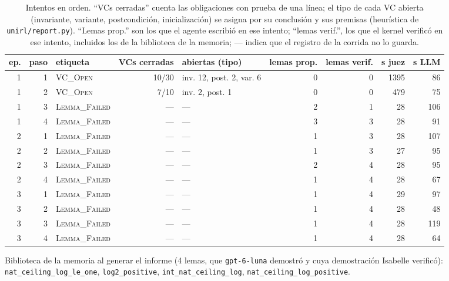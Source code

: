 \documentclass[11pt,a4paper]{article}
\begin{document}
\begin{table}[!ht]
\centering
\footnotesize
\setlength{\tabcolsep}{4pt}
\begin{tabular}{@{}rrlrlrrrr@{}}
\toprule
ep. & paso & etiqueta & VCs cerradas & abiertas (tipo) & lemas prop. & lemas verif. & s juez & s LLM \\
\midrule
1 & 1 & \textsc{VC\_Open} & 10/30 & inv. 12, post. 2, var. 6 & 0 & 0 & 1395 & 86 \\
1 & 2 & \textsc{VC\_Open} & 7/10 & inv. 2, post. 1 & 0 & 0 & 479 & 75 \\
1 & 3 & \textsc{Lemma\_Failed} & --- & --- & 2 & 1 & 28 & 106 \\
1 & 4 & \textsc{Lemma\_Failed} & --- & --- & 3 & 3 & 28 & 91 \\
2 & 1 & \textsc{Lemma\_Failed} & --- & --- & 1 & 3 & 28 & 107 \\
2 & 2 & \textsc{Lemma\_Failed} & --- & --- & 1 & 3 & 27 & 95 \\
2 & 3 & \textsc{Lemma\_Failed} & --- & --- & 2 & 4 & 28 & 95 \\
2 & 4 & \textsc{Lemma\_Failed} & --- & --- & 1 & 4 & 28 & 67 \\
3 & 1 & \textsc{Lemma\_Failed} & --- & --- & 1 & 4 & 29 & 97 \\
3 & 2 & \textsc{Lemma\_Failed} & --- & --- & 1 & 4 & 28 & 48 \\
3 & 3 & \textsc{Lemma\_Failed} & --- & --- & 1 & 4 & 28 & 119 \\
3 & 4 & \textsc{Lemma\_Failed} & --- & --- & 1 & 4 & 28 & 64 \\
\bottomrule
\end{tabular}
\caption{Intentos en orden. ``VCs cerradas'' cuenta las obligaciones con prueba de una línea; el tipo de cada VC abierta (invariante, variante, postcondición, inicialización) se asigna por su conclusión y sus premisas (heurística de \texttt{unirl/report.py}). ``Lemas prop.'' son los que el agente escribió en ese intento; ``lemas verif.'', los que el kernel verificó en ese intento, incluidos los de la biblioteca de la memoria; --- indica que el registro de la corrida no lo guarda.}
\label{tab:intentos-bisection_isabelle_lemas_mem-0}
\end{table}

Biblioteca de la memoria al generar el informe (4 lemas, que \texttt{gpt-\allowbreak{}6-\allowbreak{}luna} demostró y cuya demostración Isabelle verificó): \texttt{nat\_\allowbreak{}ceiling\_\allowbreak{}log\_\allowbreak{}le\_\allowbreak{}one}, \texttt{log2\_\allowbreak{}positive}, \texttt{int\_\allowbreak{}nat\_\allowbreak{}ceiling\_\allowbreak{}log}, \texttt{nat\_\allowbreak{}ceiling\_\allowbreak{}log\_\allowbreak{}positive}.
\end{document}

